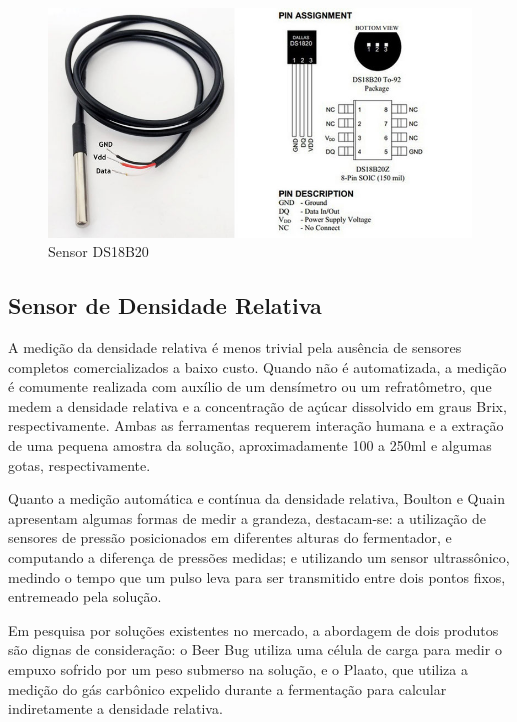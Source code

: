 \begin{figure}[h]
    \centering
    \includegraphics[scale=0.50]{figuras/projeto/hardware/ds18b20.jpg}
    \caption{Sensor DS18B20}
    \label{fig:ds18b20}
\end{figure}

\subsection{Sensor de Densidade Relativa}

A medição da densidade relativa é menos trivial pela ausência de sensores completos comercializados a baixo custo. Quando não é automatizada, a medição é comumente  realizada com auxílio de um densímetro ou um refratômetro, que medem a densidade relativa e a concentração de açúcar dissolvido em graus Brix, respectivamente. Ambas as ferramentas requerem interação humana e a extração de uma pequena amostra da solução, aproximadamente 100 a 250ml e algumas gotas, respectivamente.


Quanto a medição automática e contínua da densidade relativa, Boulton e Quain \cite{BoultonQuain} apresentam algumas formas de medir a grandeza, destacam-se: a utilização de sensores de pressão posicionados em diferentes alturas do fermentador, e computando a diferença de pressões medidas; e utilizando um sensor ultrassônico,  medindo o tempo que um pulso leva para ser transmitido entre dois pontos fixos, entremeado pela solução. 


Em pesquisa por soluções existentes no mercado, a abordagem de dois produtos são dignas de consideração: o Beer Bug utiliza uma célula de carga para medir o empuxo sofrido por um peso submerso na solução, e o Plaato, que utiliza a medição do gás carbônico expelido durante a fermentação para calcular indiretamente a densidade relativa.


